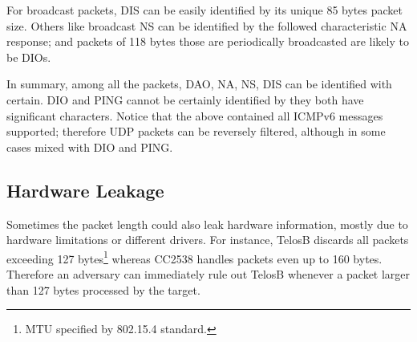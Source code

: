 For broadcast packets, DIS can be easily identified by its unique 85 bytes packet size. Others like broadcast NS can be identified by the followed characteristic NA response; and packets of 118 bytes those are periodically broadcasted are likely to be DIOs.

In summary, among all the packets, DAO, NA, NS, DIS can be identified with certain. DIO and PING cannot be certainly identified by they both have significant characters. Notice that the above contained all ICMPv6 messages supported; therefore UDP packets can be reversely filtered, although in some cases mixed with DIO and PING.


\subsection{Hardware Leakage}
Sometimes the packet length could also leak hardware information, mostly due to hardware limitations or different drivers. For instance, TelosB\cite{TelosB} discards all packets exceeding 127 bytes\footnote{MTU specified by 802.15.4 standard.} whereas CC2538 handles packets even up to 160 bytes. Therefore an adversary can immediately rule out TelosB whenever a packet larger than 127 bytes processed by the target.
